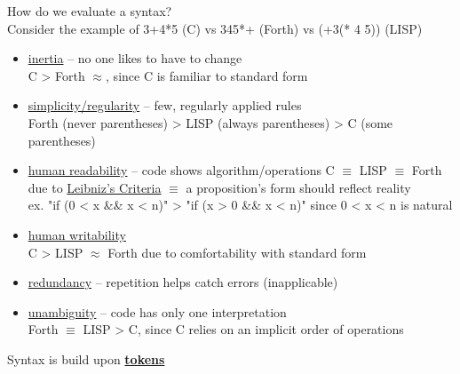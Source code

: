 \documentclass[../../lecture_notes.tex]{subfiles}
\begin{document}
\noindent How do we evaluate a syntax?  \\
Consider the example of 3+4*5 (C) vs 345*+ (Forth) vs (+3(* 4 5)) (LISP)
\begin{itemize} [itemsep=0mm]
	\item \underline{inertia} -- no one likes to have to change\\
		C > Forth $\approx$, since C is familiar to standard form
	\item \underline{simplicity/regularity} -- few, regularly applied rules\\
		Forth (never parentheses) > LISP (always parentheses) > C (some parentheses)
	\item \underline{human readability} -- code shows algorithm/operations
		C $\equiv$ LISP $\equiv$ Forth due to 
			\underline{Leibniz's Criteria} $\equiv$ a proposition's form should reflect reality\\
				ex. "if (0 < x \&\& x < n)" > "if (x > 0 \&\& x < n)" since 0 < x < n is natural
	\item \underline{human writability}\\
		C  > LISP $\approx$ Forth due to comfortability with standard form
	\item \underline{redundancy} -- repetition helps catch errors (inapplicable)
	\item \underline{unambiguity} -- code has only one interpretation\\
		Forth $\equiv$ LISP > C, since C relies on an implicit order of operations
\end{itemize}
Syntax is build upon \textbf{\underline{tokens}}
\end{document}
